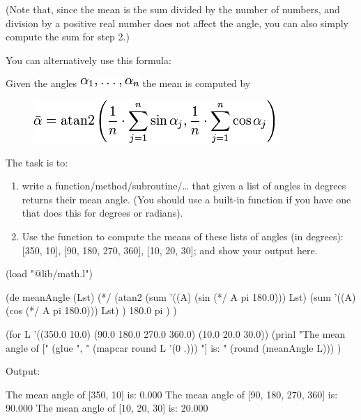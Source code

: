 (Note that, since the mean is the sum divided by the number of numbers,
and division by a positive real number does not affect the angle, you
can also simply compute the sum for step 2.)

You can alternatively use this formula:

Given the
angles \includegraphics[scale=.6]{graphics/e5d832c5ee9a16553e635e05c2892174.png}
the mean is computed by

\begin{figure}[H]
\centering
\includegraphics[scale=.6]{graphics/1a4bfb06a8eb34d1ac09405c02d064c4.png}
\end{figure}

The task is to:

\begin{enumerate}
\item
  write a function/method/subroutine/\ldots{} that given a list of
  angles in degrees returns their mean angle. (You should use a built-in
  function if you have one that does this for degrees or radians).
\item
  Use the function to compute the means of these lists of angles (in
  degrees): {[}350, 10{]}, {[}90, 180, 270, 360{]}, {[}10, 20, 30{]};
  and show your output here.
\end{enumerate}


\begin{wideverbatim}

(load "@lib/math.l")
 
(de meanAngle (Lst)
   (*/
      (atan2
         (sum '((A) (sin (*/ A pi 180.0))) Lst)
         (sum '((A) (cos (*/ A pi 180.0))) Lst) )
      180.0 pi ) )
 
(for L '((350.0 10.0) (90.0 180.0 270.0 360.0) (10.0 20.0 30.0))
   (prinl
      "The mean angle of ["
      (glue ", " (mapcar round L '(0 .)))
      "] is: " (round (meanAngle L))) )

Output:

The mean angle of [350, 10] is: 0.000
The mean angle of [90, 180, 270, 360] is: 90.000
The mean angle of [10, 20, 30] is: 20.000

\end{wideverbatim}


